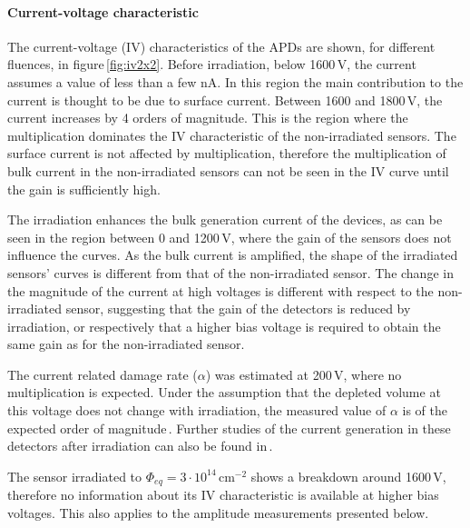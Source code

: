 \documentclass[review,number,sort&compress]{elsarticle}
\begin{document}
\paragraph{Current-voltage characteristic}
The current-voltage (IV) characteristics of the APDs are shown, for different fluences, in figure\,\ref{fig:iv2x2}.
Before irradiation, below 1600\,V, the current assumes a value of less than a few nA.
In this region the main contribution to the current is thought to be due to surface current.
Between 1600 and 1800\,V, the current increases by 4 orders of magnitude.
This is the region where the multiplication dominates the IV characteristic of the non-irradiated sensors.
The surface current is not affected by multiplication, therefore the multiplication of bulk current in the non-irradiated sensors can not be seen in the IV curve until the gain is sufficiently high.

The irradiation enhances the bulk generation current of the devices, as can be seen in the region between 0 and 1200\,V, where the gain of the sensors does not influence the curves.
As the bulk current is amplified, the shape of the irradiated sensors' curves is different from that of the non-irradiated sensor.
The change in the magnitude of the current at high voltages is different with respect to the non-irradiated sensor, suggesting that the gain of the detectors is reduced by irradiation, or respectively that a higher bias voltage is required to obtain the same gain as for the non-irradiated sensor.

The current related damage rate ($\alpha$) was estimated at 200\,V, where no multiplication is expected.
Under the assumption that the depleted volume at this voltage does not change with irradiation, the measured value of $\alpha$ is of the expected order of magnitude\,\cite{ugobonoThesis}.
Further studies of the current generation in these detectors after irradiation can also be found in\,\cite{ugobonoThesis}.

The sensor irradiated to $\Phi_{eq} = 3 \cdot 10^{14}$\,cm$^{-2}$ shows a breakdown around 1600\,V, therefore no information about its IV characteristic is available at higher bias voltages.
This also applies to the amplitude measurements presented below.
\end{document}
